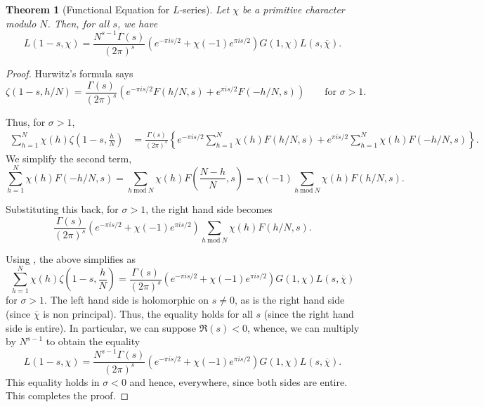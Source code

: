 \documentclass[12pt]{article}
\theoremstyle{thmstyle}
\newtheorem{theorem}{Theorem}[section]
\theoremstyle{defstyle}
\renewcommand{\mod}{~\mathrm{mod}~}
\begin{document}
\begin{theorem}[Functional Equation for $L$-series]
    Let $\chi$ be a primitive character modulo $N$. Then, for all $s$, we have 
    \begin{equation*}
        L(1 - s, \chi) = \frac{N^{s - 1}\Gamma(s)}{(2\pi)^s}\left(e^{-\pi i s/2} + \chi(-1)e^{\pi is/2}\right)G(1,\chi) L(s,\overline\chi).
    \end{equation*}
\end{theorem}
\begin{proof}
    Hurwitz's formula says
    \begin{equation*}
        \zeta(1 - s, h/N) = \frac{\Gamma(s)}{(2\pi)^s}\left(e^{-\pi is/2}F(h/N, s) + e^{\pi is/2}F(-h/N, s)\right)\qquad\text{for }\sigma > 1.
    \end{equation*}

    Thus, for $\sigma > 1$,
    \begin{align*}
        \sum_{h = 1}^N\chi(h)\zeta\left(1 - s, \frac{h}{N}\right) &= \frac{\Gamma(s)}{(2\pi)^s}\left\{e^{-\pi is/2}\sum_{h = 1}^N\chi(h)F(h/N, s) + e^{\pi is/2}\sum_{h = 1}^N \chi(h)F(-h/N, s)\right\}.
    \end{align*}
    We simplify the second term,
    \begin{equation*}
        \sum_{h = 1}^N\chi(h)F(-h/N, s) = \sum_{h\mod N}\chi(h)F\left(\frac{N - h}{N}, s\right) = \chi(-1)\sum_{h\mod N}\chi(h)F(h/N, s).
    \end{equation*}

    Substituting this back, for $\sigma > 1$, the right hand side becomes
    \begin{equation*}
        \frac{\Gamma(s)}{(2\pi)^s}\left(e^{-\pi is/2} + \chi(-1)e^{\pi is/2}\right)\sum_{h\mod N}\chi(h)F(h/N, s).
    \end{equation*}

    Using , the above simplifies as 
    \begin{equation*}
        \sum_{h = 1}^N\chi(h)\zeta\left(1 - s, \frac{h}{N}\right) = 
        \frac{\Gamma(s)}{(2\pi)^s}\left(e^{-\pi is/2} + \chi(-1)e^{\pi is/2}\right)G(1, \chi) L(s,\overline\chi)
    \end{equation*}
    for $\sigma > 1$. The left hand side is holomorphic on $s\ne 0$, as is the right hand side (since $\overline\chi$ is non principal). Thus, the equality holds for all $s$ (since the right hand side is entire). In particular, we can suppose $\Re(s) < 0$, whence, we can multiply by $N^{s - 1}$ to obtain the equality 
    \begin{equation*}
        L(1 - s, \chi) = \frac{N^{s - 1}\Gamma(s)}{(2\pi)^s}\left(e^{-\pi i s/2} + \chi(-1)e^{\pi is/2}\right)G(1,\chi) L(s,\overline\chi).
    \end{equation*}
    This equality holds in $\sigma < 0$ and hence, everywhere, since both sides are entire. This completes the proof.
\end{proof}
\end{document}
